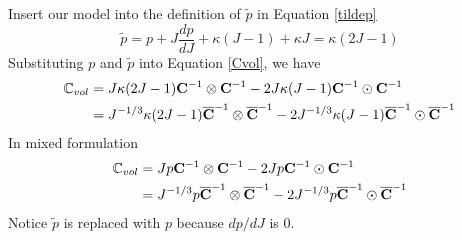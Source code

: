 %
Insert our model into the definition of $\tilde{p}$ in Equation \ref{tildep}
\begin{equation}
\tilde{p} = p + J\frac{dp}{dJ} + \kappa(J-1) + \kappa{J} = \kappa{(2J - 1)}
\end{equation}
Substituting $p$ and $\tilde{p}$ into Equation \ref{Cvol}, we have
\begin{equation} \label{mCvol1}
\begin{split}
\mathbb{C}_{vol} &= J\kappa{(2J-1)} \bold{C}^{-1} \otimes \bold{C}^{-1} - 2J\kappa{(J-1)} \bold{C}^{-1} \odot \bold{C}^{-1}  \\
&= J^{-1/3}\kappa{(2J-1)} \overline{\bold{C}}^{-1} \otimes \overline{\bold{C}}^{-1} - 2J^{-1/3}\kappa{(J-1)} \overline{\bold{C}}^{-1} \odot \overline{\bold{C}}^{-1}
\end{split}
\end{equation}
In mixed formulation
\begin{equation} \label{mCvol2}
\begin{split}
\mathbb{C}_{vol} &= Jp\bold{C}^{-1}\otimes\bold{C}^{-1} - 2Jp\bold{C}^{-1}\odot\bold{C}^{-1} \\
&= J^{-1/3}p\overline{\bold{C}}^{-1}\otimes\overline{\bold{C}}^{-1} - 2J^{-1/3}p\overline{\bold{C}}^{-1}\odot\overline{\bold{C}}^{-1}
\end{split}
\end{equation}
Notice $\tilde{p}$ is replaced with $p$ because ${dp}/{dJ}$ is $0$.

